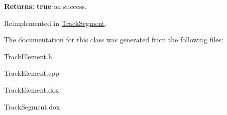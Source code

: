 {\bfseries Returns\-:} {\bfseries true} on success. 

Reimplemented in \hyperlink{classKite_1_1TrackSegment_aa1ef325b98fab61d2c7c5bdc1fcd92fc}{Track\-Segment}.



The documentation for this class was generated from the following files\-:\begin{DoxyCompactItemize}
\item 
Track\-Element.\-h\item 
Track\-Element.\-cpp\item 
Track\-Element.\-dox\item 
Track\-Segment.\-dox\end{DoxyCompactItemize}

